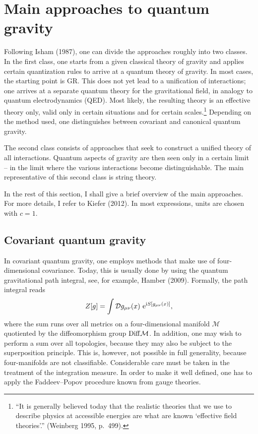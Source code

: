 \documentclass[12pt,a4paper]{article}
\newcommand{\be}{\begin{equation}}
\newcommand{\ee}{\end{equation}}
\newcommand{\lb}{\label}
\newcommand{\E}{{\rm e}}
\newcommand{\I}{{\rm i}}
\begin{document}

\section{Main approaches to quantum gravity}

Following Isham (1987), one can divide the approaches roughly into two
classes. 
In the first class, one starts from a given classical theory of
gravity and applies certain quantization rules to arrive at a quantum
theory of gravity. In most cases, the starting point is GR. This does
not yet lead to a unification of interactions; one arrives at a
separate quantum theory for the gravitational field, in analogy to
quantum electrodynamics (QED). Most likely, the resulting theory is an
effective theory only, valid only in certain situations and for
certain scales.\footnote{``It is generally believed today that the
  realistic theories that we use to describe physics at accessible
  energies are what are known `effective field theories'.'' (Weinberg
  1995, p.~499).} Depending on the method used, one distinguishes
between covariant and canonical quantum gravity.

The second class consists of approaches that seek to construct a
unified theory of all interactions. Quantum aspects of gravity are
then seen only in a certain limit -- in the limit where the various
interactions become distinguishable. The main representative of this
second class is string theory. 

In the rest of this section, I shall give a brief overview of the main
approaches. For more details, I refer to Kiefer (2012). In most
expressions, units are chosen with $c=1$.


\subsection{Covariant quantum gravity}

In covariant quantum gravity, one employs methods that make use of
four-dimensional covariance. Today, this is usually done by using the
quantum gravitational path integral, see, for example, Hamber (2009). 
Formally, the path integral reads
\be
\lb{pathgrav}
Z[g]=\int{\mathcal D}g_{\mu\nu}(x)\ \E^{\I S[g_{\mu\nu}(x)]},
\ee
where the sum runs over all metrics on a four-dimensional manifold
${\mathcal M}$ quotiented by the diffeomorphism group
${\rm Diff}{\mathcal M}$. 
In addition, one may wish to perform a sum
over all topologies, because they may also be subject to the
superposition principle. This is, however, not possible in full generality,
because four-manifolds are not classifiable. Considerable care must be
taken in the treatment of the integration measure. 
In order to make it well defined, one has to apply
the Faddeev--Popov procedure known from gauge theories. 
\end{document}
